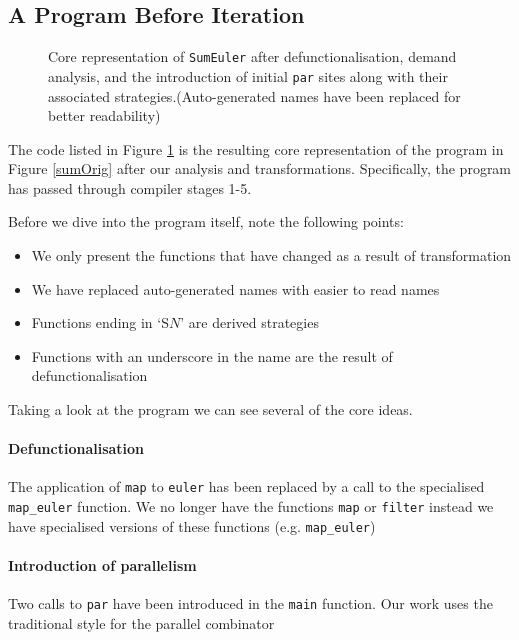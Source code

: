 \subsection{A Program Before Iteration}

\begin{figure}[t!]
  
\caption{Core representation of \texttt{SumEuler} after defunctionalisation, demand
         analysis, and the introduction of initial \texttt{par} sites along
         with their associated strategies.(Auto-generated names have been
         replaced for better readability)}
\label{sumLast}
\end{figure}

The code listed in Figure \ref{sumLast} is the resulting core representation
of the program in Figure \ref{sumOrig} after our analysis and transformations.
Specifically, the program has passed through compiler stages 1-5.

Before we dive into the program itself, note the following points:

\begin{itemize}
    \item We only present the functions that have changed as a result of transformation
    \item We have replaced auto-generated names with easier to read names
    \item Functions ending in `S$N$' are derived strategies
    \item Functions with an underscore in the name are the result of defunctionalisation
\end{itemize}

Taking a look at the program we can see several of the core ideas.

\paragraph{Defunctionalisation}
The application of \verb-map- to \verb-euler- has been replaced by a call to
the specialised \verb-map_euler- function.  We no longer have the functions
\verb-map- or \verb-filter- instead we have specialised versions of these
functions (e.g. \verb-map_euler-)

\paragraph{Introduction of parallelism}
Two calls to \verb-par- have been introduced in the \texttt{main} function. Our
work uses the traditional style for the parallel combinator \citep{strategies}

